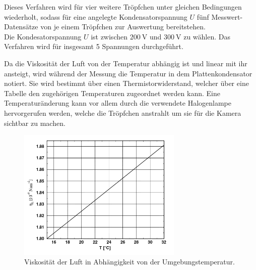 Dieses Verfahren wird für vier weitere Tröpfchen unter gleichen Bedingungen wiederholt, sodass für eine angelegte Kondensatorspannung $U$ fünf Messwert-Datensätze von je einem Tröpfchen zur Auswertung bereitstehen.\\
Die Kondesatorspannung $U$ ist zwischen $\SI{200}{\volt}$ und $\SI{300}{\volt}$ zu wählen.
Das Verfahren wird für insgesamt 5 Spannungen durchgeführt.

Da die Viskosität der Luft von der Temperatur abhängig ist und linear mit ihr ansteigt,
wird während der Messung  die Temperatur in dem Plattenkondensator notiert. Sie wird bestimmt über einen Thermistorwiderstand, welcher über eine Tabelle den zugehörigen Temperaturen zugeordnet werden kann. Eine Temperaturänderung kann vor allem durch die verwendete Halogenlampe hervorgerufen werden, welche die Tröpfchen anstrahlt um sie für die Kamera sichtbar zu machen.


\begin{figure}[h]
	\centering
	\includegraphics[width=0.7\textwidth]{Bilder/Temp.png}
	\caption{Viskosität der Luft in Abhängigkeit von der Umgebungstemperatur. \cite{skript}}
	\label{fig:temp}
\end{figure}


